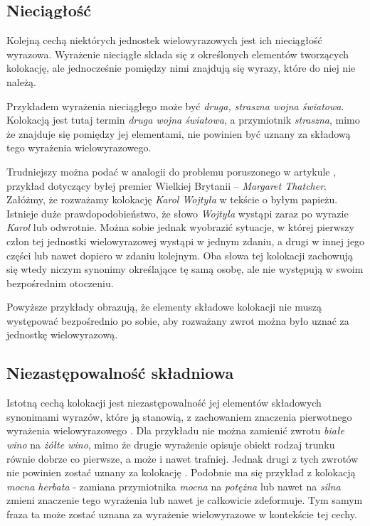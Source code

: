 \subsection{Nieciągłość}
Kolejną cechą niektórych jednostek wielowyrazowych jest ich nieciągłość wyrazowa. 
Wyrażenie nieciągłe składa się z określonych elementów tworzących kolokację, ale jednocześnie pomiędzy nimi znajdują się wyrazy, które do niej nie należą.
\par
Przykładem wyrażenia nieciągłego może być \emph{druga, straszna wojna światowa}. 
Kolokacją jest tutaj termin \emph{druga wojna światowa}, a przymiotnik \emph{straszna}, mimo że znajduje się pomiędzy jej elementami, nie powinien być uznany za składową tego wyrażenia wielowyrazowego.
\par
Trudniejszy można podać w analogii do problemu poruszonego w artykule \cite[str. 1]{fdpn}, przykład dotyczący byłej premier Wielkiej Brytanii -- \emph{Margaret Thatcher}.
Załóżmy, że rozważamy kolokację \emph{Karol Wojtyła} w tekście o byłym papieżu.
Istnieje duże prawdopodobieństwo, że słowo \emph{Wojtyła} wystąpi zaraz po wyrazie \emph{Karol} lub odwrotnie. 
Można sobie jednak wyobrazić sytuacje, w której pierwszy człon tej jednostki wielowyrazowej wystąpi w jednym zdaniu, a drugi w innej jego części lub nawet dopiero w zdaniu kolejnym. 
Oba słowa tej kolokacji zachowują się wtedy niczym synonimy określające tę samą osobę, ale nie występują w swoim bezpośrednim otoczeniu.
\par
Powyższe przykłady obrazują, że elementy składowe kolokacji nie muszą występować bezpośrednio po sobie, aby rozważany zwrot można było uznać za jednostkę wielowyrazową.


\subsection{Niezastępowalność składniowa}
Istotną cechą kolokacji jest niezastępowalność jej elementów składowych synonimami wyrazów, które ją stanowią, z zachowaniem znaczenia pierwotnego wyrażenia wielowyrazowego \cite[str. 184]{mit}.
Dla przykładu nie można zamienić zwrotu \emph{białe wino} na \emph{żółte wino}, mimo że drugie wyrażenie opisuje obiekt rodzaj trunku równie dobrze co pierwsze, a może i nawet trafniej.
Jednak drugi z tych zwrotów nie powinien zostać uznany za kolokację \cite[str. 184]{mit}. 
Podobnie ma się przykład z kolokacją \emph{mocna herbata} - zamiana przymiotnika \emph{mocna} na \emph{potężna} lub nawet na \emph{silna} zmieni znaczenie tego wyrażenia lub nawet je całkowicie zdeformuje.
Tym samym fraza ta może zostać uznana za wyrażenie wielowyrazowe w kontekście tej cechy.


